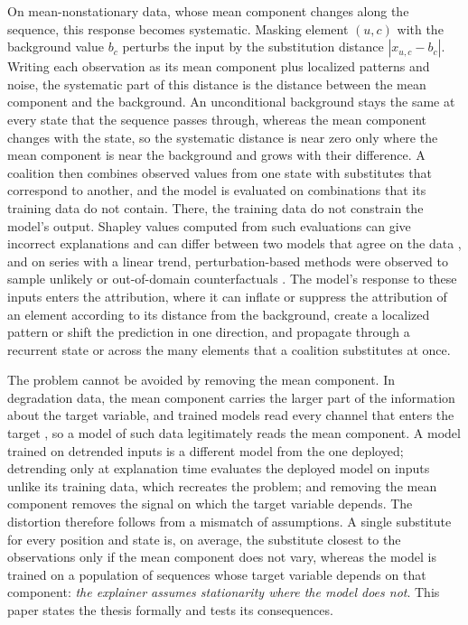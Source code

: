 \documentclass{article}
\begin{document}
On mean-nonstationary data, whose mean component changes along the sequence, this response becomes systematic. Masking element $(u,c)$ with the background value $b_c$ perturbs the input by the substitution distance $|x_{u,c}-b_c|$. Writing each observation as its mean component plus localized patterns and noise, the systematic part of this distance is the distance between the mean component and the background. An unconditional background stays the same at every state that the sequence passes through, whereas the mean component changes with the state, so the systematic distance is near zero only where the mean component is near the background and grows with their difference. A coalition then combines observed values from one state with substitutes that correspond to another, and the model is evaluated on combinations that its training data do not contain. There, the training data do not constrain the model's output. Shapley values computed from such evaluations can give incorrect explanations and can differ between two models that agree on the data \citep{frye2021shapley}, and on series with a linear trend, perturbation-based methods were observed to sample unlikely or out-of-domain counterfactuals \citep{tonekaboni2020went}. The model's response to these inputs enters the attribution, where it can inflate or suppress the attribution of an element according to its distance from the background, create a localized pattern or shift the prediction in one direction, and propagate through a recurrent state or across the many elements that a coalition substitutes at once.

The problem cannot be avoided by removing the mean component. In degradation data, the mean component carries the larger part of the information about the target variable, and trained models read every channel that enters the target \citep{degradx2026}, so a model of such data legitimately reads the mean component. A model trained on detrended inputs is a different model from the one deployed; detrending only at explanation time evaluates the deployed model on inputs unlike its training data, which recreates the problem; and removing the mean component removes the signal on which the target variable depends. The distortion therefore follows from a mismatch of assumptions. A single substitute for every position and state is, on average, the substitute closest to the observations only if the mean component does not vary, whereas the model is trained on a population of sequences whose target variable depends on that component: \emph{the explainer assumes stationarity where the model does not}. This paper states the thesis formally and tests its consequences.
\end{document}
